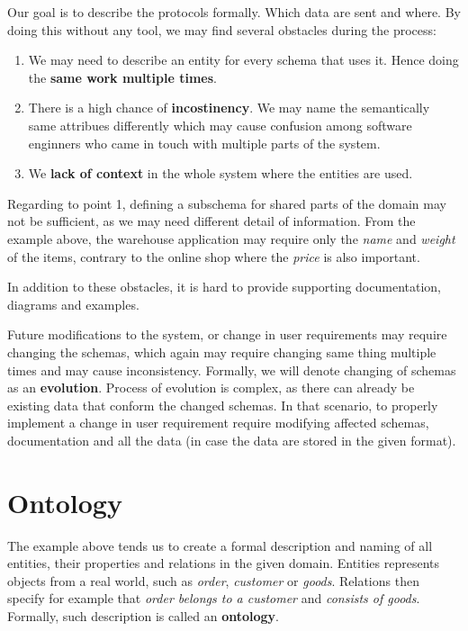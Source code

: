 Our goal is to describe the protocols formally. Which data are sent and where. By doing this without any tool, we may find several obstacles during the process:

\begin{enumerate}
    \item We may need to describe an entity for every schema that uses it. Hence doing the \textbf{same work multiple times}.
    \item There is a high chance of \textbf{incostinency}. We may name the semantically same attribues differently which may cause confusion among software enginners who came in touch with multiple parts of the system.
    \item We \textbf{lack of context} in the whole system where the entities are used.
\end{enumerate}

Regarding to point 1, defining a subschema for shared parts of the domain may not be sufficient, as we may need different detail of information. From the example above, the warehouse application may require only the \textit{name} and \textit{weight} of the items, contrary to the online shop where the \textit{price} is also important.

In addition to these obstacles, it is hard to provide supporting documentation, diagrams and examples.

Future modifications to the system, or change in user requirements may require changing the schemas, which again may require changing same thing multiple times and may cause inconsistency. Formally, we will denote changing of schemas as an \textbf{evolution}. Process of evolution is complex, as there can already be existing data that conform the changed schemas. In that scenario, to properly implement a change in user requirement require modifying affected schemas, documentation and all the data (in case the data are stored in the given format).

\section*{Ontology}

The example above tends us to create a formal description and naming of all entities, their properties and relations in the given domain. Entities represents objects from a real world, such as \textit{order}, \textit{customer} or \textit{goods}. Relations then specify for example that \textit{order belongs to a customer} and \textit{consists of goods}. Formally, such description is called an \textbf{ontology}.


